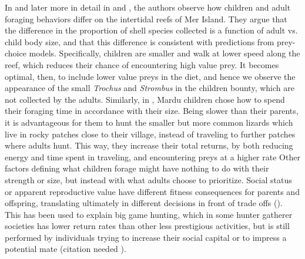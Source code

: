 In \cite{bliege_bird_children_1995} and later more in detail in \cite{bird_ethnoarchaeology_2000} and \cite{bird_children_2002}, the authors observe how children and adult foraging behaviors differ on the intertidal reefs of Mer Island. They argue that the difference in the proportion of shell species collected is a function of adult vs. child body size, and that this difference is consistent with predictions from prey-choice models. 
Specifically, children are smaller and walk at lower speed along the reef, which reduces their chance of encountering high value prey. It becomes optimal, then, to include lower value preys in the diet, and hence we observe the appearance of the small \textit{Trochus} and \textit{Strombus} in the children bounty, which are not collected by the adults.
Similarly, in \cite{bird_mardu_2005}, Mardu children chose how to spend their foraging time in accordance with their size. Being slower than their parents, it is advantageous for them to hunt the smaller but more common lizards which live in rocky patches close to their village, instead of traveling to further patches where adults hunt. This way, they increase their total returns, by both reducing energy and time spent in traveling, and encountering preys at a higher rate 
Other factors defining what children forage might have nothing to do with their strength or size, but instead with what adults choose to prioritize. Social status or apparent reproductive value have different fitness consequences for parents and offspring, translating ultimately in different decisions in front of trade offs (\cite{bird_constraints_2002}). This has been used to explain big game hunting, which in some hunter gatherer societies has lower return rates than other less prestigious activities, but is still performed by individuals trying to increase their social capital or to impress a potential mate (citation needed \cite{}).   

